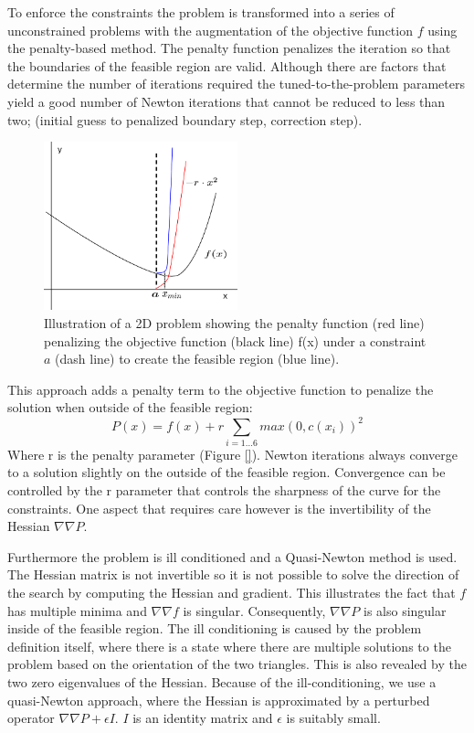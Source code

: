 To enforce the constraints the problem is transformed into a series of unconstrained problems with the augmentation of the objective function $f$ using the penalty-based method. The penalty function penalizes the iteration so that the boundaries of the feasible region are valid. Although there are factors that determine the number of iterations required the tuned-to-the-problem parameters yield a good number of Newton iterations that cannot be reduced to less than two; (initial guess to penalized boundary step, correction step).

\begin{figure}[htb]
  \begin{center}
    \includegraphics[width=0.5\textwidth]{sketches/penalty.png}
  \end{center}
  \caption{
Illustration of a 2D problem showing the penalty function (red line) penalizing the objective function (black line) f(x) under a constraint $a$ (dash line) to create the feasible region (blue line).
  }
  \label{figure:penaltyfunction}
\end{figure}

This approach adds a penalty term to the objective function to penalize the solution when outside of the feasible region: 
\begin{equation}\label{eq:penalty}
P(x)=f(x)+r\sum_{i=1...6}max(0,c(x_{i}))^{2}
\end{equation}
Where r is the penalty parameter (Figure \ref{}). Newton iterations always converge to a solution slightly on the outside of the feasible region. Convergence can be controlled by the r parameter that controls the sharpness of the curve for the constraints. One aspect that requires care however is the invertibility of the Hessian $\nabla\nabla P$. 

Furthermore the problem is ill conditioned and a Quasi-Newton method is used. The Hessian matrix is not invertible so it is not possible to solve the direction of the search by computing the Hessian and gradient. This illustrates the fact that $f$ has multiple minima and $\nabla\nabla f$ is singular. Consequently, $\nabla\nabla P$ is also singular inside of the feasible region. The ill conditioning is caused by the problem definition itself, where there is a state where there are multiple solutions to the problem based on the orientation of the two triangles. This is also revealed by the two zero eigenvalues of the Hessian. Because of the ill-conditioning, we use a quasi-Newton approach, where the Hessian is approximated by a perturbed operator $\nabla\nabla P + \epsilon I$. $I$ is an identity matrix and $\epsilon$ is suitably small.

